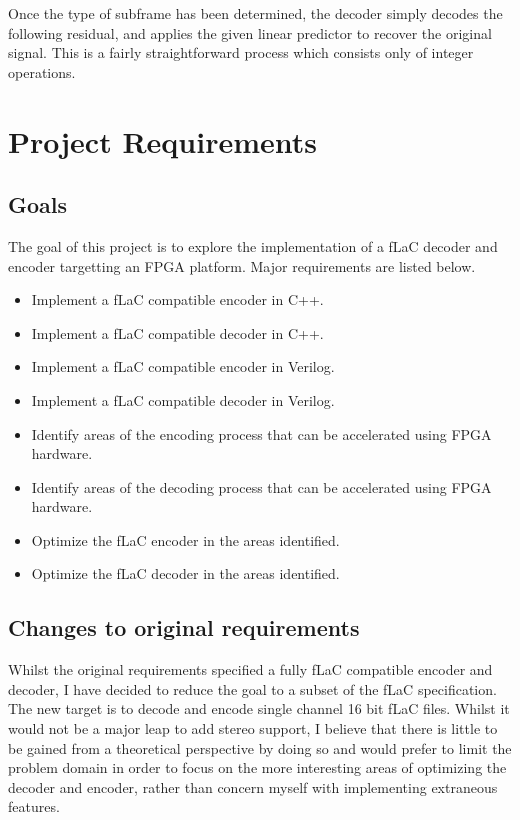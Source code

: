 \documentclass[12pt]{scrartcl}
\begin{document}
  Once the type of subframe has been determined, the decoder simply decodes the following residual, and applies the given linear predictor to recover the original signal. This is a fairly straightforward process which consists only of integer operations.
  
  \section{Project Requirements}
  \subsection{Goals}
  The goal of this project is to explore the implementation of a fLaC decoder and encoder targetting an FPGA platform. Major requirements are listed below.
  \begin{itemize}
    \item Implement a fLaC compatible encoder in C++.
    \item Implement a fLaC compatible decoder in C++.
    \item Implement a fLaC compatible encoder in Verilog.
    \item Implement a fLaC compatible decoder in Verilog.
    \item Identify areas of the encoding process that can be accelerated using FPGA hardware.
    \item Identify areas of the decoding process that can be accelerated using FPGA hardware.
    \item Optimize the fLaC encoder in the areas identified.
    \item Optimize the fLaC decoder in the areas identified.
  \end{itemize}
  
  \subsection{Changes to original requirements}
  Whilst the original requirements specified a fully fLaC compatible encoder and decoder, I have decided to reduce the goal to a subset of the fLaC specification. The new target is to decode and encode single channel 16 bit fLaC files. Whilst it would not be a major leap to add stereo support, I believe that there is little to be gained from a theoretical perspective by doing so and would prefer to limit the problem domain in order to focus on the more interesting areas of optimizing the decoder and encoder, rather than concern myself with implementing extraneous features.\\
      
\end{document}
